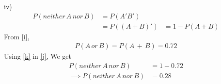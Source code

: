 \documentclass[journal,12pt,twocolumn]{IEEEtran}
\begin{document}
iv)
\begin{align}
    P(neither\, A\, nor\, B) &= P(A'B')\\
    &=P((A+B)')
    &=1-P(A+B)\label{j}
\end{align}
From \eqref{i},
\begin{align}
    P(A\,or\,B) =P(A\,+\,B)=0.72\label{k}
\end{align}
Using \eqref{k} in \eqref{j}, We get
\begin{align}
    P(neither\, A\, nor\, B)&=1-0.72\\
   \implies P(neither\, A\, nor\, B)&=0.28
\end{align}
\end{document}

